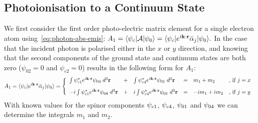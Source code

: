 \subsection{Photoionisation to a Continuum State}
    We first consider the first order photo-electric matrix element for a single
    electron atom using~\ref{eq:photon-abs-emis}:
    \(
        A_1 = \langle \psi_c| \mathcal{A} |\psi_0 \rangle = \langle \psi_c| e^{i \mathbf{k} \cdot \mathbf{r} } \bar{\alpha}_j |\psi_0 \rangle .
    \)
    In the case that the incident photon is polarised either in the $x$ or $y$
    direction, and knowing that the second components of the ground state
    and continuum states are both zero ($\psi_{02} = 0$ and $\psi_{c2} = 0$)
    results in the following form for $A_1$:
    \[ 
        A_1 = \langle \psi_c| e^{i \mathbf{k} \cdot \mathbf{r} } \bar{\alpha}_j |\psi_0 \rangle =
        \left\{ 
        \begin{array}{llllll} 

            \int \psi_{c 1}^{*} e^{i \mathbf{k} \cdot \mathbf{r} } \psi_{0 4} \; d^3 \mathbf{r} 
            & + &
            \int \psi_{c 4}^{*} e^{i \mathbf{k} \cdot \mathbf{r} } \psi_{0 1} \; d^3 \mathbf{r}
            & = & m_1 + m_2
            & \mbox{, if $j = x$} 

            \\[3mm]

            -i \int \psi_{c 1}^{*} e^{i \mathbf{k} \cdot \mathbf{r} } \psi_{0 4} \; d^3 \mathbf{r}
            & + &
             i \int \psi_{c 4}^{*} e^{i \mathbf{k} \cdot \mathbf{r} } \psi_{0 1} \; d^3 \mathbf{r}
            & = & -i m_1 + i m_2
            & \mbox{, if $j = y$} 

        \end{array} 
        \right .
    \]
    With known values for the spinor components $\psi_{c 1}$, $\psi_{c 4}$,
    $\psi_{0 1}$ and $\psi_{0 4}$ we can determine the integrals $m_1$ and
    $m_2$.

